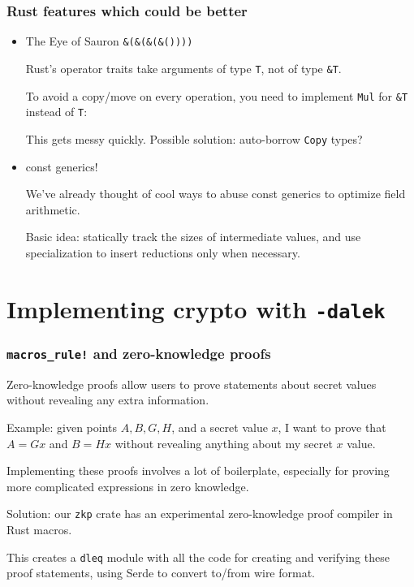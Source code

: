 \documentclass[xetex,aspectratio=169]{beamer}
\begin{document}
  \begin{frame}
    \frametitle{Rust features which could be better}
    \begin{itemize}
      \item The \alert{Eye of Sauron} \pause \texttt{\&(\&(\&(\&())))}

        \pause
        Rust's operator traits take arguments of type \texttt{T}, not of type \texttt{\&T}.

        \pause To avoid a copy/move on every operation, you need to implement \texttt{Mul} for \texttt{\&T} instead of \texttt{T}:

        
        \pause This gets messy quickly.  Possible solution: auto-borrow \texttt{Copy} types?
        
    \pause \item \alert{const generics!}
        
        \pause We've already thought of cool ways to abuse const generics to optimize field arithmetic.
        
        \pause Basic idea: statically track the sizes of intermediate values, and use specialization to insert reductions only when necessary.

    \end{itemize}
  \end{frame}
  
\section{Implementing crypto with \texttt{-dalek}}

  \begin{frame}
    \frametitle{\texttt{macros\_rule!} and zero-knowledge proofs}
    
    \alert{Zero-knowledge proofs} allow users to prove statements about secret values without revealing any extra information.

    \pause Example: given points $A, B, G, H$, and a secret value $x$, I want to prove that $A = Gx$ and $B = Hx$ without revealing anything about my secret $x$ value.

    \pause Implementing these proofs involves a lot of boilerplate, especially for proving more complicated expressions in zero knowledge.
    
    \pause \alert{Solution}: our \texttt{zkp} crate has an experimental zero-knowledge proof compiler in Rust macros.
    

    \pause This creates a \texttt{dleq} module with all the code for creating and verifying these proof statements, using Serde to convert to/from wire format.
  \end{frame}
  
\end{document}
